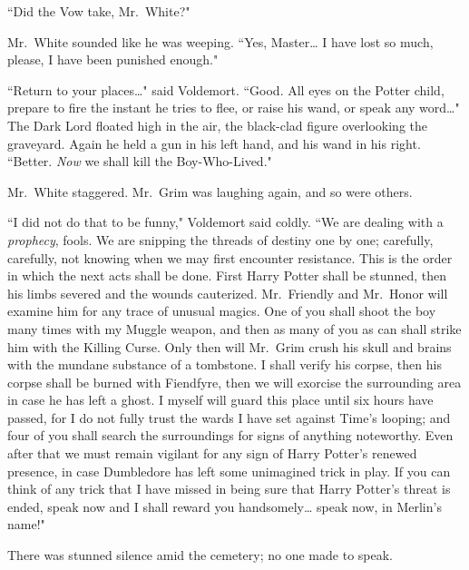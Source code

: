 ``Did the Vow take, Mr.~White?"

Mr.~White sounded like he was weeping. ``Yes, Master{\ldots} I have lost so much, please, I have been punished enough."

``Return to your places{\ldots}" said Voldemort. ``Good. All eyes on the Potter child, prepare to fire the instant he tries to flee, or raise his wand, or speak any word{\ldots}" The Dark Lord floated high in the air, the black-clad figure overlooking the graveyard. Again he held a gun in his left hand, and his wand in his right. ``Better. \emph{Now} we shall kill the Boy-Who-Lived."

Mr.~White staggered. Mr.~Grim was laughing again, and so were others.

``I did not do that to be funny," Voldemort said coldly. ``We are dealing with a \emph{prophecy}, fools. We are snipping the threads of destiny one by one; carefully, carefully, not knowing when we may first encounter resistance. This is the order in which the next acts shall be done. First Harry Potter shall be stunned, then his limbs severed and the wounds cauterized. Mr.~Friendly and Mr.~Honor will examine him for any trace of unusual magics. One of you shall shoot the boy many times with my Muggle weapon, and then as many of you as can shall strike him with the Killing Curse. Only then will Mr.~Grim crush his skull and brains with the mundane substance of a tombstone. I shall verify his corpse, then his corpse shall be burned with Fiendfyre, then we will exorcise the surrounding area in case he has left a ghost. I myself will guard this place until six hours have passed, for I do not fully trust the wards I have set against Time's looping; and four of you shall search the surroundings for signs of anything noteworthy. Even after that we must remain vigilant for any sign of Harry Potter's renewed presence, in case Dumbledore has left some unimagined trick in play. If you can think of any trick that I have missed in being sure that Harry Potter's threat is ended, speak now and I shall reward you handsomely{\ldots} speak now, in Merlin's name!"

There was stunned silence amid the cemetery; no one made to speak.

